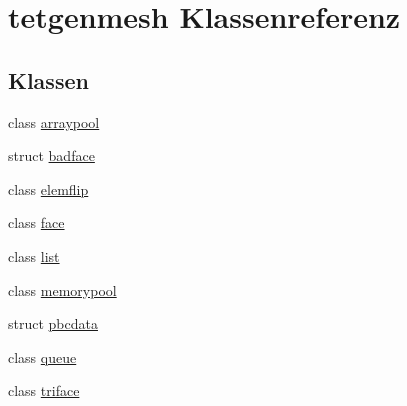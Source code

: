 \hypertarget{classtetgenmesh}{\section{tetgenmesh Klassenreferenz}
\label{classtetgenmesh}
}
\subsection*{Klassen}
\begin{DoxyCompactItemize}
\item 
class \hyperlink{classtetgenmesh_1_1arraypool}{arraypool}
\item 
struct \hyperlink{structtetgenmesh_1_1badface}{badface}
\item 
class \hyperlink{classtetgenmesh_1_1elemflip}{elemflip}
\item 
class \hyperlink{classtetgenmesh_1_1face}{face}
\item 
class \hyperlink{classtetgenmesh_1_1list}{list}
\item 
class \hyperlink{classtetgenmesh_1_1memorypool}{memorypool}
\item 
struct \hyperlink{structtetgenmesh_1_1pbcdata}{pbcdata}
\item 
class \hyperlink{classtetgenmesh_1_1queue}{queue}
\item 
class \hyperlink{classtetgenmesh_1_1triface}{triface}
\end{DoxyCompactItemize}
